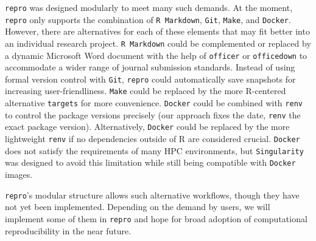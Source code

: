 \documentclass[psych,tutorial,submit,moreauthors,pdftex]{mdpi}
\begin{document}
\texttt{repro} was designed modularly to meet many such demands. At the
moment, \texttt{repro} only supports the combination of
\texttt{R\ Markdown}, \texttt{Git}, \texttt{Make}, and \texttt{Docker}.
However, there are alternatives for each of these elements that may fit
better into an individual research project. \texttt{R\ Markdown} could
be complemented or replaced by a dynamic Microsoft Word document with
the help of \texttt{officer} \citep{officer} or \texttt{officedown}
\citep{officedown} to accommodate a wider range of journal submission
standards. Instead of using formal version control with \texttt{Git},
\texttt{repro} could automatically save snapshots for increasing
user-friendliness. \texttt{Make} could be replaced by the more
R-centered alternative \texttt{targets} for more convenience.
\texttt{Docker} could be combined with \texttt{renv} \citep{R-renv} to
control the package versions precisely (our approach fixes the date,
\texttt{renv} the exact package version). Alternatively, \texttt{Docker}
could be replaced by the more lightweight \texttt{renv} if no
dependencies outside of R are considered crucial. \texttt{Docker} does
not satisfy the requirements of many HPC environments, but
\texttt{Singularity} was designed to avoid this limitation while still
being compatible with \texttt{Docker} images.

\texttt{repro}'s modular structure allows such alternative workflows,
though they have not yet been implemented. Depending on the demand by
users, we will implement some of them in \texttt{repro} and hope for
broad adoption of computational reproducibility in the near future.

%

\vspace{6pt}

\end{document}
